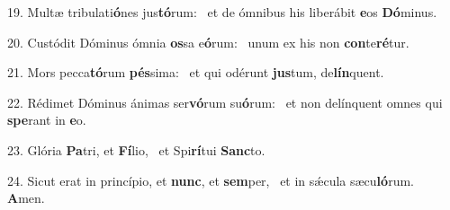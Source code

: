 19. Multæ tribulati\textbf{ó}nes jus\textbf{tó}rum: \ast\  et de ómnibus his liberábit \textbf{e}os \textbf{Dó}minus.\

20. Custódit Dóminus ómnia \textbf{os}sa e\textbf{ó}rum: \ast\  unum ex his non \textbf{con}te\textbf{ré}tur.\

21. Mors pecca\textbf{tó}rum \textbf{pés}sima: \ast\  et qui odérunt \textbf{jus}tum, de\textbf{lín}quent.\

22. Rédimet Dóminus ánimas ser\textbf{vó}rum su\textbf{ó}rum: \ast\  et non delínquent omnes qui \textbf{spe}rant in \textbf{e}o.\

23. Glória \textbf{Pa}tri, et \textbf{Fí}lio, \ast\  et Spi\textbf{rí}tui \textbf{Sanc}to.\

24. Sicut erat in princípio, et \textbf{nunc}, et \textbf{sem}per, \ast\  et in sǽcula sæcu\textbf{ló}rum. \textbf{A}men.\

